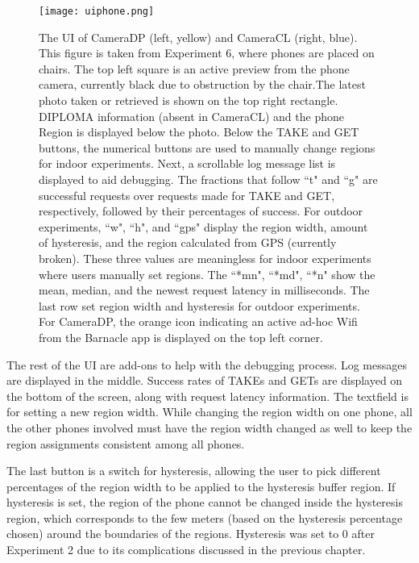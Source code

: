 \begin{figure}[htb]
\begin{center}
\texttt{[image: uiphone.png]}
\caption{The UI of CameraDP (left, yellow) and CameraCL (right, blue). This figure is taken from Experiment 6, where phones are placed on chairs. The top left square is an active preview from the phone camera, currently black due to obstruction by the chair.The latest photo taken or retrieved is shown on the top right rectangle. DIPLOMA information (absent in CameraCL) and the phone Region is displayed below the photo. Below the TAKE and GET buttons, the numerical buttons are used to manually change regions for indoor experiments. Next, a scrollable log message list is displayed to aid debugging. The fractions that follow ``t" and ``g" are successful requests over requests made for TAKE and GET, respectively, followed by their percentages of success. For outdoor experiments, ``w", ``h", and ``gps" display the region width, amount of hysteresis, and the region calculated from GPS (currently broken). These three values are meaningless for indoor experiments where users manually set regions. The ``*mn", ``*md", ``*n" show the mean, median, and the newest request latency in milliseconds. The last row set region width and hysteresis for outdoor experiments. For CameraDP, the orange icon indicating an active ad-hoc Wifi from the Barnacle app is displayed on the top left corner.}
\label{fig:uiphone-png}
\end{center}
\end{figure}

The rest of the UI are add-ons to help with the debugging process. Log messages are displayed in the middle. Success rates of TAKEs and GETs are displayed on the bottom of the screen, along with request latency information. The textfield is for setting a new region width. While changing the region width on one phone, all the other phones involved must have the region width changed as well to keep the region assignments consistent among all phones. 

The last button is a switch for hysteresis, allowing the user to pick different percentages of the region width to be applied to the hysteresis buffer region. If hysteresis is set, the region of the phone cannot be changed inside the hysteresis region, which corresponds to the few meters (based on the hysteresis percentage chosen) around the boundaries of the regions. Hysteresis was set to 0 after Experiment 2 due to its complications discussed in the previous chapter.

